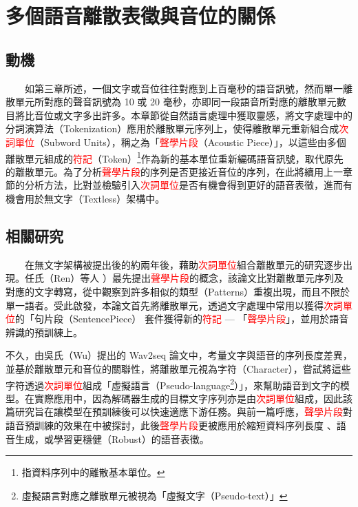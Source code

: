 
\renewcommand{\arraystretch}{0.7}
\chapter{多個語音離散表徵與音位的關係}

\section{動機}

　　如第三章所述，一個文字或音位往往對應到上百毫秒的語音訊號，然而單一離散單元所對應的聲音訊號為 10 或 20 毫秒，亦即同一段語音所對應的離散單元數目將比音位或文字多出許多。本章節從自然語言處理中獲取靈感，將文字處理中的分詞演算法（Tokenization）應用於離散單元序列上，使得離散單元重新組合成\textcolor{red}{次詞單位}（Subword Units），稱之為「\textcolor{red}{聲學片段}（Acoustic Piece）」，以這些由多個離散單元組成的\textcolor{red}{符記}（Token）\footnote{指資料序列中的離散基本單位。}作為新的基本單位重新編碼語音訊號，取代原先的離散單元。為了分析\textcolor{red}{聲學片段}的序列是否更接近音位的序列，在此將續用上一章節的分析方法，比對並檢驗引入\textcolor{red}{次詞單位}是否有機會得到更好的語音表徵，進而有機會用於無文字（Textless）架構\cite{lakhotia_generative_2021, lakhotia_generative_2021-1, noauthor_textless_2021}中。

\section{相關研究} 

　　在無文字架構被提出後的約兩年後，藉助\textcolor{red}{次詞單位}組合離散單元的研究逐步出現。任氏（Ren）等人 \cite{ren_speech_2022}）最先提出\textcolor{red}{聲學片段}的概念，該論文比對離散單元序列及對應的文字轉寫，從中觀察到許多相似的類型（Patterns）重複出現，而且不限於單一語者。受此啟發，本論文首先將離散單元，透過文字處理中常用以獲得\textcolor{red}{次詞單位}的「句片段（SentencePiece） \cite{kudo_sentencepiece_2018} 套件獲得新的\textcolor{red}{符記} --- 「\textcolor{red}{聲學片段}」，並用於語音辨識的預訓練上。

        不久，由吳氏（Wu）提出的 Wav2seq \cite{wu_wav2seq_2023}論文中，考量文字與語音的序列長度差異，並基於離散單元和音位的關聯性，將離散單元視為字符（Character），嘗試將這些字符透過\textcolor{red}{次詞單位}組成「虛擬語言（Pseudo-language\footnote{虛擬語言對應之離散單元被視為「虛擬文字（Pseudo-text）」}）」，來幫助語音到文字的模型。在實際應用中，因為解碼器生成的目標文字序列亦是由\textcolor{red}{次詞單位}組成，因此該篇研究旨在讓模型在預訓練後可以快速適應下游任務。與前一篇呼應，\textcolor{red}{聲學片段}對語音預訓練的效果在\cite{10096788}中被探討，此後\textcolor{red}{聲學片段}更被應用於縮短資料序列長度\cite{chang_exploration_2023} 、語音生成\cite{shen2024acoustic}，或學習更穩健（Robust）的語音表徵\cite{chang2023r}。


